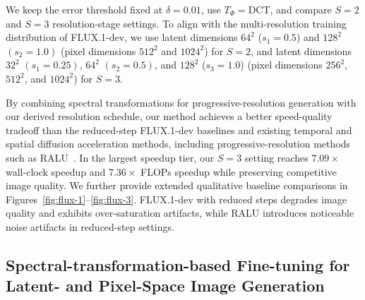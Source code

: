 We keep the error threshold fixed at $\delta=0.01$, use $T_\Phi = \text{DCT}$, and compare $S=2$ and $S=3$ resolution-stage settings. To align with the multi-resolution training distribution of FLUX.1-dev, we use latent dimensions $64^2$ ($s_1 = 0.5$) and $128^2$ $(s_2 = 1.0)$ (pixel dimensions $512^2$ and $1024^2$) for $S=2$, and latent dimensions $32^2$ $(s_1 = 0.25)$, $64^2$ $(s_2 = 0.5)$, and $128^2$ ($s_3 = 1.0$) (pixel dimensions $256^2$, $512^2$, and $1024^2$) for $S=3$.

By combining spectral transformations for progressive-resolution generation with our derived resolution schedule, our method achieves a better speed-quality tradeoff than the reduced-step FLUX.1-dev baselines and existing temporal and spatial diffusion acceleration methods, including progressive-resolution methods such as RALU~\citep{ralu}. In the largest speedup tier, our $S=3$ setting reaches $7.09\times$ wall-clock speedup and $7.36\times$ FLOPs speedup while preserving competitive image quality. We further provide extended qualitative baseline comparisons in Figures~\ref{fig:flux-1}--\ref{fig:flux-3}. FLUX.1-dev with reduced steps degrades image quality and exhibits over-saturation artifacts, while RALU introduces noticeable noise artifacts in reduced-step settings.



\subsection{Spectral-transformation-based Fine-tuning for Latent- and Pixel-Space Image Generation}
\label{subsec:image_pixel}
